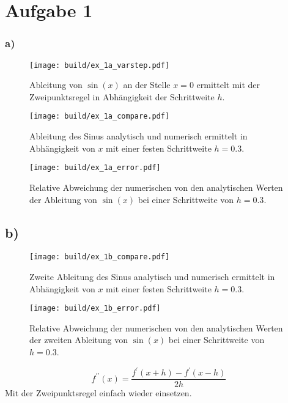 \section*{Aufgabe 1}
\subsubsection*{a)}
\begin{figure}
    \centering
    \texttt{[image: build/ex\_1a\_varstep.pdf]}
    \caption{Ableitung von $\sin(x)$ an der Stelle $x=0$ ermittelt mit der Zweipunktsregel
    in Abhängigkeit der Schrittweite $h$.}
    \label{fig:h_dep}
\end{figure}

\begin{figure}
    \centering
    \texttt{[image: build/ex\_1a\_compare.pdf]}
    \caption{Ableitung des Sinus analytisch und numerisch ermittelt in Abhängigkeit von 
    $x$ mit einer festen Schrittweite $h=0.3$.}
    \label{fig:a_comp}
\end{figure}

\begin{figure}
    \centering
    \texttt{[image: build/ex\_1a\_error.pdf]}
    \caption{Relative Abweichung der numerischen von den analytischen Werten der Ableitung von $\sin(x)$
    bei einer Schrittweite von $h=0.3$.}
    \label{fig:rel_a}
\end{figure}
\FloatBarrier
%
\subsection*{b)}
\begin{figure}
    \centering
    \texttt{[image: build/ex\_1b\_compare.pdf]}
    \caption{Zweite Ableitung des Sinus analytisch und numerisch ermittelt in Abhängigkeit von 
    $x$ mit einer festen Schrittweite $h=0.3$.}
    \label{fig:b_comp}
\end{figure}

\begin{figure}
    \centering
    \texttt{[image: build/ex\_1b\_error.pdf]}
    \caption{Relative Abweichung der numerischen von den analytischen Werten der zweiten Ableitung von $\sin(x)$
    bei einer Schrittweite von $h=0.3$.}
    \label{fig:rel_b}
\end{figure}

\begin{equation*}
    f^{\prime \prime} (x) = \frac{f^{\prime}(x+h) - f^{\prime}(x-h)}{2h}    
\end{equation*}
Mit der Zweipunktsregel einfach wieder einsetzen.

